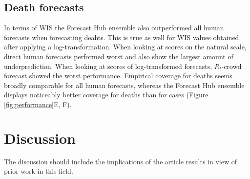 \documentclass[10pt,a4paper,twocolumn]{article}
\begin{document}
\begin{table}[!h]
\centering
{}
\caption{Table caption}
\label{tab:scores}
\end{table}


\subsection*{Death forecasts} 

In terms of WIS the Forecast Hub ensemble also outperformed all human forecasts when forecasting deahts. This is true as well for WIS values obtained after applying a log-transformation. When looking at scores on the natural scale, direct human forecasts performed worst and also show the largest amount of underprediction. When looking at scores of log-transformed forecasts, $R_t$-crowd forecast showed the worst performance. Empirical coverage for deaths seems broadly comparable for all human forecasts, whereas the Forecast Hub ensemble displays noticeably better coverage for deaths than for cases (Figure \ref{fig:performance}E, F). 







\section*{Discussion}
The discussion should include the implications of the article results in view of prior work in this field.
\end{document}

